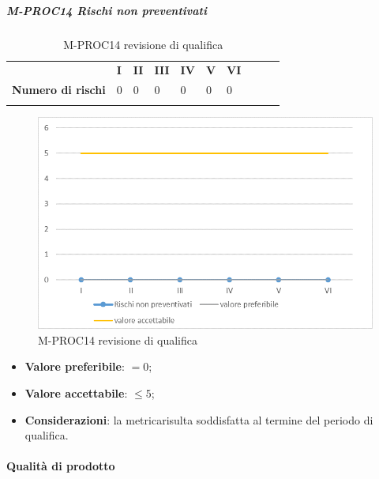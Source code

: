 \subparagraph{M-PROC14 Rischi non preventivati} \mbox{}
\begin{longtable}[H!] {						
		>{}p{50mm}  		
		>{}p{8mm}
		>{}p{8mm}		
		>{}p{8mm}		
		>{}p{8mm}		
		>{}p{8mm}		
		>{}p{8mm}
		>{}p{8mm}
		>{}p{8mm}
		>{}p{8mm}
	}
	\rowcolor{gray!50}
	\textbf{} & \textbf{I} & \textbf{II} & \textbf{III} & \textbf{IV} & \textbf{V} & \textbf{VI} \TBstrut \\ [2mm]
	\textbf{Numero di rischi} & 0 & 0 & 0 & 0 & 0 & 0 \TBstrut \\ [2mm]
	\rowcolor{white}
	\caption{M-PROC14 revisione di qualifica}
\end{longtable}
\begin{figure}[H] 	
	\includegraphics[width=\linewidth]{./img/grafici/RQ14.png}	
	\caption{M-PROC14 revisione di qualifica}	
\end{figure}
\begin{itemize}
	\item \textbf{Valore preferibile}: $=0$;
	\item \textbf{Valore accettabile}: $\le 5$;
	\item \textbf{Considerazioni}: la metrica\glosp risulta soddisfatta al termine del periodo di qualifica.
\end{itemize}

\paragraph{Qualità di prodotto}

